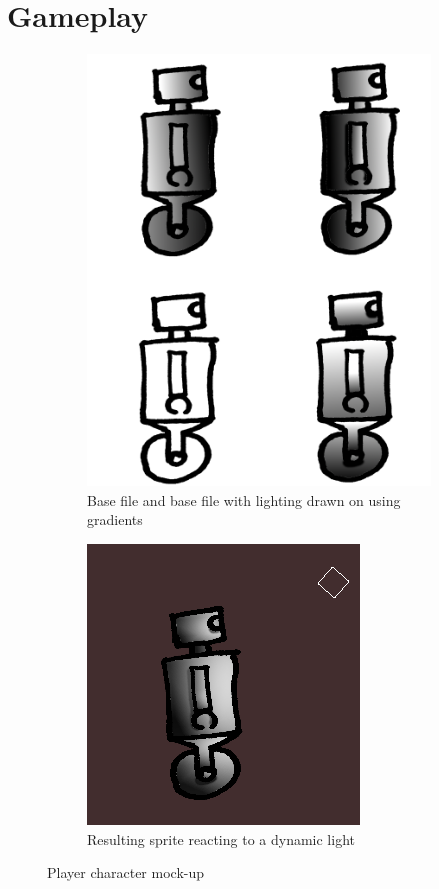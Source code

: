\section{Gameplay}


\begin{figure}[ht]
\centering
\begin{subfigure}{.5\textwidth}
  \centering
  \includegraphics[scale=0.2, trim = 0cm 0cm 0cm 2cm]{images/in}
  \caption{Base file and base file with lighting drawn on using gradients}
  \label{fig:sub1:pl}
\end{subfigure}%
\begin{subfigure}{.5\textwidth}
  \centering
  \includegraphics[scale=0.9, trim = 0cm 0cm 0cm 0.5cm]{images/out}	
  \caption{Resulting sprite reacting to a dynamic light}
  \label{fig:sub2:pl}
\end{subfigure}
\caption{Player character mock-up}
\label{fig:player}
\end{figure}

